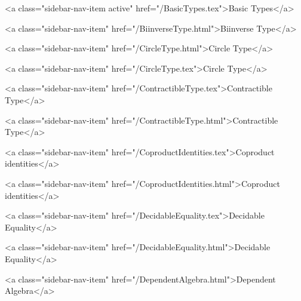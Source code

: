           <a class="sidebar-nav-item active" href="/BasicTypes.tex">Basic Types</a>
        
      
    
      
        
          <a class="sidebar-nav-item" href="/BiinverseType.html">Biinverse Type</a>
        
      
    
      
        
          <a class="sidebar-nav-item" href="/CircleType.html">Circle Type</a>
        
      
    
      
        
          <a class="sidebar-nav-item" href="/CircleType.tex">Circle Type</a>
        
      
    
      
        
          <a class="sidebar-nav-item" href="/ContractibleType.tex">Contractible Type</a>
        
      
    
      
        
          <a class="sidebar-nav-item" href="/ContractibleType.html">Contractible Type</a>
        
      
    
      
        
          <a class="sidebar-nav-item" href="/CoproductIdentities.tex">Coproduct identities</a>
        
      
    
      
        
          <a class="sidebar-nav-item" href="/CoproductIdentities.html">Coproduct identities</a>
        
      
    
      
        
          <a class="sidebar-nav-item" href="/DecidableEquality.tex">Decidable Equality</a>
        
      
    
      
        
          <a class="sidebar-nav-item" href="/DecidableEquality.html">Decidable Equality</a>
        
      
    
      
        
          <a class="sidebar-nav-item" href="/DependentAlgebra.html">Dependent Algebra</a>
        
      
    
